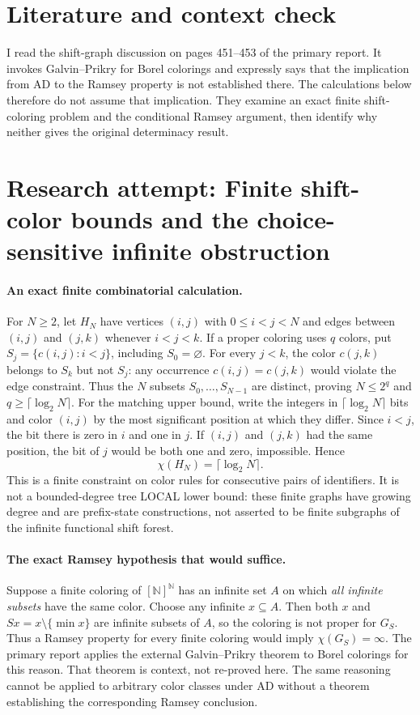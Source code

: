 \documentclass[11pt]{article}
\begin{document}
\section{Literature and context check}

I read the shift-graph discussion on pages 451--453 of the primary report.
It invokes Galvin--Prikry for Borel colorings and expressly says that the
implication from AD to the Ramsey property is not established there.
The calculations below therefore do not assume that implication. They examine
an exact finite shift-coloring problem and the conditional Ramsey argument,
then identify why neither gives the original determinacy result.

\section{Research attempt: Finite shift-color bounds and the choice-sensitive infinite obstruction}

\paragraph{An exact finite combinatorial calculation.}
For $N\geq2$, let $H_N$ have vertices $(i,j)$ with $0\leq i<j<N$ and
edges between $(i,j)$ and $(j,k)$ whenever $i<j<k$.
If a proper coloring uses $q$ colors, put
$S_j=\{c(i,j):i<j\}$, including $S_0=\varnothing$.
For every $j<k$, the color $c(j,k)$ belongs to $S_k$ but not $S_j$:
any occurrence $c(i,j)=c(j,k)$ would violate the edge constraint.
Thus the $N$ subsets $S_0,\ldots,S_{N-1}$ are distinct, proving
$N\leq2^q$ and $q\geq\lceil\log_2N\rceil$.
For the matching upper bound, write the integers in
$\lceil\log_2N\rceil$ bits and color $(i,j)$ by the most significant
position at which they differ. Since $i<j$, the bit there is zero in $i$
and one in $j$. If $(i,j)$ and $(j,k)$ had the same position, the bit of
$j$ would be both one and zero, impossible. Hence
\[
 \chi(H_N)=\lceil\log_2N\rceil.
\]
This is a finite constraint on color rules for consecutive pairs of identifiers.
It is not a bounded-degree tree LOCAL lower bound: these finite graphs have
growing degree and are prefix-state constructions, not asserted to be finite
subgraphs of the infinite functional shift forest.

\paragraph{The exact Ramsey hypothesis that would suffice.}
Suppose a finite coloring of $[\mathbb N]^{\mathbb N}$ has an infinite set
$A$ on which \emph{all infinite subsets} have the same color.
Choose any infinite $x\subseteq A$. Then both $x$ and
$Sx=x\setminus\{\min x\}$ are infinite subsets of $A$, so the coloring
is not proper for $G_S$. Thus a Ramsey property for every finite coloring
would imply $\chi(G_S)=\infty$.
The primary report applies the external Galvin--Prikry theorem to Borel
colorings for this reason. That theorem is context, not re-proved here.
The same reasoning cannot be applied to arbitrary color classes under AD
without a theorem establishing the corresponding Ramsey conclusion.
\end{document}
